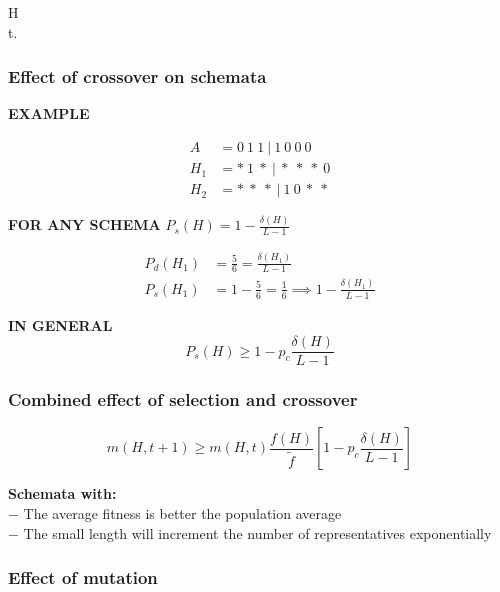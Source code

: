 \bigskip

\noindent {}
 H  \\
 t.

\subsubsection{Effect of crossover on schemata}

\textbf{EXAMPLE}

\[
\begin{aligned}
A &= 0 \ 1 \ 1 \ | \ 1 \ 0 \ 0 \ 0 \\
H_1 &= * \ 1 \ * \ | \ * \ * \ * \ 0 \\
H_2 &= * \ * \ * \ | \ 1 \ 0 \ * \ *
\end{aligned}
\]

\bigskip

\noindent \textbf{FOR ANY SCHEMA} \quad \( P_s(H) = 1 - \frac{\delta(H)}{L-1} \)

\bigskip

\[
\begin{aligned}
P_d(H_1) &= \frac{5}{6} = \frac{\delta(H_1)}{L-1} \\
P_s(H_1) &= 1 - \frac{5}{6} = \frac{1}{6} \implies 1 - \frac{\delta(H_1)}{L-1}
\end{aligned}
\]

\noindent \textbf{IN GENERAL}
\[
P_s(H) \geq 1 - p_c \frac{\delta(H)}{L-1}
\]

\vspace{1em}

\subsubsection{Combined effect of selection and crossover}
\[
m(H, t+1) \geq m(H, t) \frac{f(H)}{\tilde{f}} \left[ 1 - p_c \frac{\delta(H)}{L-1} \right]
\]

\vspace{1em}

\noindent \textbf{Schemata with:} \\
$-$ The average fitness is better the population average  \\
$-$ The small length will increment the number of representatives exponentially


\subsubsection{Effect of mutation}

